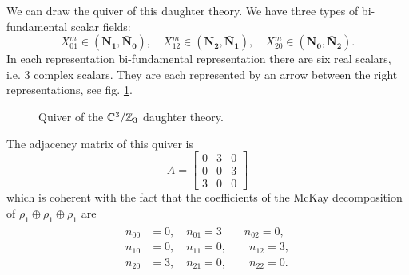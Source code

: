             We can draw the quiver of this daughter theory. We have three types of bi-fundamental scalar fields:
            \begin{equation}
                X^m_{01}\in(\boldsymbol{\textbf{N}_{1}},\boldsymbol{\bar{\textbf{N}}_0}),\quad
                X^m_{12}\in(\boldsymbol{\textbf{N}_{2}},\boldsymbol{\bar{\textbf{N}}_1}),\quad
                X^m_{20}\in(\boldsymbol{\textbf{N}_{0}},\boldsymbol{\bar{\textbf{N}}_2}).
            \end{equation}
            In each representation bi-fundamental representation there are six real scalars, i.e. 3 complex scalars. They are each represented by an arrow between the right representations, see fig. \ref{fig:Z3quiver}.
            \begin{figure}[H]
                \centering
                \caption{Quiver of the $\mathbb{C}^3/\mathbb{Z}_3$ daughter theory.}
                \label{fig:Z3quiver}
            \end{figure}
            The adjacency matrix of this quiver is
            \begin{equation}
                A=
                \begin{bmatrix}
                    0 & 3 & 0 \\
                    0 & 0 & 3 \\
                    3 & 0 & 0
                \end{bmatrix}
            \end{equation}
            which is coherent with the fact that the coefficients of the McKay decomposition of $\rho_1\oplus\rho_1\oplus\rho_1$ are
            \begin{align}
                \begin{split}
                    n_{00} &= 0,\quad n_{01} = 3\qquad n_{02}=0,\\
                    n_{10} &= 0,\quad n_{11} = 0,\qquad n_{12}=3,\\
                    n_{20} &= 3,\quad n_{21} = 0,\qquad n_{22}=0.
                \end{split}
            \end{align}

